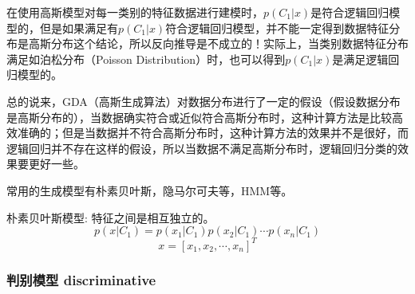 在使用高斯模型对每一类别的特征数据进行建模时，$p(C_1|x)$是符合逻辑回归模型的，但是如果满足有$p(C_1|x)$符合逻辑回归模型，并不能一定得到数据特征分布是高斯分布这个结论，所以反向推导是不成立的！实际上，当类别数据特征分布满足如泊松分布（Poisson Distribution）时，也可以得到$p(C_1|x)$是满足逻辑回归模型的。

总的说来，GDA（高斯生成算法）对数据分布进行了一定的假设（假设数据分布是高斯分布的），当数据确实符合或近似符合高斯分布时，这种计算方法是比较高效准确的；但是当数据并不符合高斯分布时，这种计算方法的效果并不是很好，而逻辑回归并不存在这样的假设，所以当数据不满足高斯分布时，逻辑回归分类的效果要更好一些。

常用的生成模型有朴素贝叶斯，隐马尔可夫等，HMM等。

\begin{myquotation}{朴素贝叶斯模型:}
	特征之间是相互独立的。
	$$p(x|C_1)=p(x_1|C_1)p(x_2|C_1) \cdots p(x_n|C_1)$$
	$$x=[x_1,x_2,\cdots,x_n]^T$$
\end{myquotation}

\subsubsection{判别模型 discriminative}

